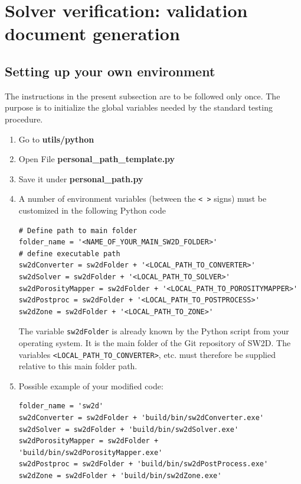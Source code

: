 \section{Solver verification: validation document generation}\label{sec:merge-solver}
\subsection{Setting up your own environment}
The instructions in the present subsection are to be followed only once. The purpose is to initialize the global variables needed by the standard testing procedure.
\begin{enumerate}
\item Go to \textbf{utils/python}
\item Open File \textbf{personal\_path\_template.py}
\item Save it under \textbf{personal\_path.py} 
\item A number of environment variables (between the \texttt{< >} signs) must be customized in the following Python code
\begin{lstlisting}[basicstyle=\footnotesize]
# Define path to main folder
folder_name = '<NAME_OF_YOUR_MAIN_SW2D_FOLDER>' 
# define executable path
sw2dConverter = sw2dFolder + '<LOCAL_PATH_TO_CONVERTER>'
sw2dSolver = sw2dFolder + '<LOCAL_PATH_TO_SOLVER>'
sw2dPorosityMapper = sw2dFolder + '<LOCAL_PATH_TO_POROSITYMAPPER>'
sw2dPostproc = sw2dFolder + '<LOCAL_PATH_TO_POSTPROCESS>'
sw2dZone = sw2dFolder + '<LOCAL_PATH_TO_ZONE>'
\end{lstlisting}

The variable \texttt{sw2dFolder} is already known by the Python script from your operating system. It is the main folder of the Git repository of SW2D. The variables \texttt{<LOCAL\_PATH\_TO\_CONVERTER>}, etc. must therefore be supplied relative to this main folder path.
\item Possible example of your modified code:
\begin{lstlisting}[basicstyle=\footnotesize]
folder_name = 'sw2d'
sw2dConverter = sw2dFolder + 'build/bin/sw2dConverter.exe'
sw2dSolver = sw2dFolder + 'build/bin/sw2dSolver.exe'
sw2dPorosityMapper = sw2dFolder + 'build/bin/sw2dPorosityMapper.exe'
sw2dPostproc = sw2dFolder + 'build/bin/sw2dPostProcess.exe'
sw2dZone = sw2dFolder + 'build/bin/sw2dZone.exe'
\end{lstlisting}
\end{enumerate}
